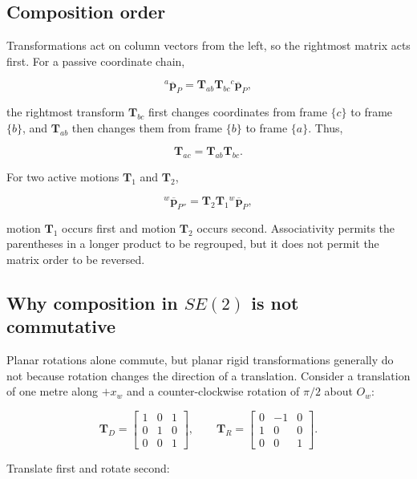 \documentclass[
  australian,
  12pt,
  letterpaper,
  DIV=11,
  numbers=noendperiod,
  twoside]{scrreprt}
\begin{document}
\subsection{Composition order}\label{composition-order}

Transformations act on column vectors from the left, so the rightmost
matrix acts first. For a passive coordinate chain,

\[
{}^{a}\overline{\mathbf p}_P
=
\mathbf T_{ab}\mathbf T_{bc}{}^{c}\overline{\mathbf p}_P,
\]

the rightmost transform \(\mathbf T_{bc}\) first changes coordinates
from frame \(\{c\}\) to frame \(\{b\}\), and \(\mathbf T_{ab}\) then
changes them from frame \(\{b\}\) to frame \(\{a\}\). Thus,

\[
\mathbf T_{ac}
=
\mathbf T_{ab}\mathbf T_{bc}.
\]

For two active motions \(\mathbf T_1\) and \(\mathbf T_2\),

\[
{}^{w}\overline{\mathbf p}_{P''}
=
\mathbf T_2\mathbf T_1{}^{w}\overline{\mathbf p}_{P},
\]

motion \(\mathbf T_1\) occurs first and motion \(\mathbf T_2\) occurs
second. Associativity permits the parentheses in a longer product to be
regrouped, but it does not permit the matrix order to be reversed.

\subsection{\texorpdfstring{Why composition in \(SE(2)\) is not
commutative}{Why composition in SE(2) is not commutative}}\label{sec-se2-noncommutative}

Planar rotations alone commute, but planar rigid transformations
generally do not because rotation changes the direction of a
translation. Consider a translation of one metre along \(+x_w\) and a
counter-clockwise rotation of \(\pi/2\) about \(O_w\):

\[
\mathbf T_D
=
\begin{bmatrix}
1&0&1\\
0&1&0\\
0&0&1
\end{bmatrix},
\qquad
\mathbf T_R
=
\begin{bmatrix}
0&-1&0\\
1&0&0\\
0&0&1
\end{bmatrix}.
\]

Translate first and rotate second:
\end{document}
